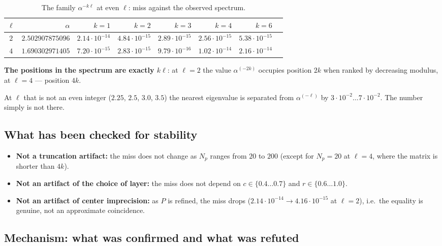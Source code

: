 \begin{table}[ht]
\centering
\caption{The family $\alpha^{-k\ell}$ at even $\ell$: miss against the observed spectrum.}
\label{tab:family-even}
{\footnotesize\setlength{\tabcolsep}{4pt}
\begin{tabular}{crrrrrrr}
\toprule
$\ell$ & $\alpha$ & $k=1$ & $k=2$ & $k=3$ & $k=4$ & $k=6$ \\
\midrule
$2$ & $2.502907875096$ & $2.14\cdot 10^{-14}$ & $4.84\cdot 10^{-15}$ & $2.89\cdot 10^{-15}$ & $2.56\cdot 10^{-15}$ & $5.38\cdot 10^{-15}$ \\
$4$ & $1.690302971405$ & $7.20\cdot 10^{-15}$ & $2.83\cdot 10^{-15}$ & $9.79\cdot 10^{-16}$ & $1.02\cdot 10^{-14}$ & $2.16\cdot 10^{-14}$ \\
\bottomrule
\end{tabular}}
\end{table}
\FloatBarrier

\textbf{The positions in the spectrum are exactly $k\ell$}: at $\ell=2$ the value
$\alpha^{(-2k)}$ occupies position $2k$ when ranked by decreasing modulus, at $\ell=4$ ---
position $4k$.

At $\ell$ that is not an even integer ($2.25$, $2.5$, $3.0$, $3.5$) the nearest eigenvalue is separated
from $\alpha^{(-\ell)}$ by $3\cdot 10^{-2} \dots 7\cdot 10^{-2}$. The number simply is not there.


\subsection{What has been checked for stability}
\label{sec:8.2}

\begin{itemize}
\item \textbf{Not a truncation artifact:} the miss does not change as $N_{p}$
  ranges from $20$ to $200$ (except for $N_{p} = 20$ at $\ell=4$, where the matrix is
  shorter than $4k$).
\item \textbf{Not an artifact of the choice of layer:} the miss does not
  depend on $c \in \{0.4 \dots 0.7\}$ and $r \in \{0.6 \dots 1.0\}$.
\item \textbf{Not an artifact of center imprecision:} as $P$ is refined, the
  miss drops ($2.14\cdot 10^{-14} \to 4.16\cdot 10^{-15}$ at $\ell=2$), i.e.\ the equality is
  genuine, not an approximate coincidence.
\end{itemize}


\subsection{Mechanism: what was confirmed and what was refuted}
\label{sec:8.3}

